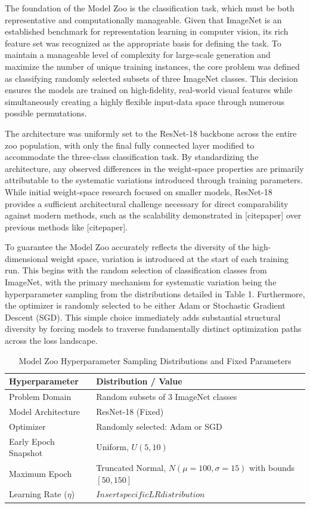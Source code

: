 The foundation of the Model Zoo is the classification task, which must be both representative and computationally manageable. Given that ImageNet is an established benchmark for representation learning in computer vision, its rich feature set was recognized as the appropriate basis for defining the task. To maintain a manageable level of complexity for large-scale generation and maximize the number of unique training instances, the core problem was defined as classifying randomly selected subsets of three ImageNet classes. This decision ensures the models are trained on high-fidelity, real-world visual features while simultaneously creating a highly flexible input-data space through numerous possible permutations.

The architecture was uniformly set to the ResNet-18 backbone across the entire zoo population, with only the final fully connected layer modified to accommodate the three-class classification task. By standardizing the architecture, any observed differences in the weight-space properties are primarily attributable to the systematic variations introduced through training parameters. While initial weight-space research focused on smaller models, ResNet-18 provides a sufficient architectural challenge necessary for direct comparability against modern methods, such as the scalability demonstrated in [citepaper] over previous methods like [citepaper].

To guarantee the Model Zoo accurately reflects the diversity of the high-dimensional weight space, variation is introduced at the start of each training run. This begins with the random selection of classification classes from ImageNet, with the primary mechanism for systematic variation being the hyperparameter sampling from the distributions detailed in Table 1. Furthermore, the optimizer is randomly selected to be either Adam or Stochastic Gradient Descent (SGD). This simple choice immediately adds substantial structural diversity by forcing models to traverse fundamentally distinct optimization paths across the loss landscape.

\begin{table}[h]
    \centering
    \caption{Model Zoo Hyperparameter Sampling Distributions and Fixed Parameters}
    \begin{tabularx}{0.8\linewidth}{@{}lX@{}}
        \toprule
        Hyperparameter & Distribution / Value \\
        \midrule
        Problem Domain & Random subsets of 3 ImageNet classes \\
        Model Architecture & ResNet-18 (Fixed) \\
        Optimizer & Randomly selected: Adam or SGD \\
        Early Epoch Snapshot & Uniform, $U(5, 10)$ \\
        Maximum Epoch & Truncated Normal, $N(\mu=100, \sigma=15)$ with bounds $[50, 150]$ \\
        Learning Rate ($\eta$) & $Insert specific LR distribution$ \\
        \bottomrule
    \end{tabularx}
    \label{tbl:model_zoo_params}
\end{table}

